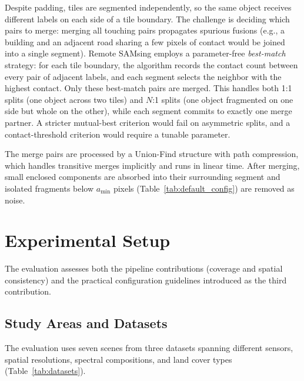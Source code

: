 \documentclass[review,11pt,authoryear]{elsarticle}
\begin{document}
Despite padding, tiles are segmented independently, so the same object receives different labels on each side of a tile boundary. The challenge is deciding which pairs to merge: merging all touching pairs propagates spurious fusions (e.g., a building and an adjacent road sharing a few pixels of contact would be joined into a single segment). Remote SAMsing employs a parameter-free \textit{best-match} strategy: for each tile boundary, the algorithm records the contact count between every pair of adjacent labels, and each segment selects the neighbor with the highest contact. Only these best-match pairs are merged. This handles both 1:1 splits (one object across two tiles) and $N$:1 splits (one object fragmented on one side but whole on the other), while each segment commits to exactly one merge partner. A stricter mutual-best criterion would fail on asymmetric splits, and a contact-threshold criterion would require a tunable parameter.

The merge pairs are processed by a Union-Find structure \citep{tarjan1975union} with path compression, which handles transitive merges implicitly and runs in linear time. After merging, small enclosed components are absorbed into their surrounding segment and isolated fragments below $a_{\min}$ pixels (Table~\ref{tab:default_config}) are removed as noise.


\section{Experimental Setup}
\label{sec:experiments}

The evaluation assesses both the pipeline contributions (coverage and spatial consistency) and the practical configuration guidelines introduced as the third contribution.

\subsection{Study Areas and Datasets}
\label{sec:exp_data}

The evaluation uses seven scenes from three datasets spanning different sensors, spatial resolutions, spectral compositions, and land cover types (Table~\ref{tab:datasets}).
\end{document}
